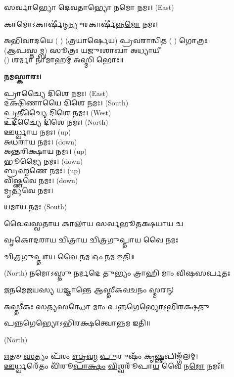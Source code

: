 𑌸𑌰𑍍𑌵𑌾𑌭𑍍𑌯𑍋 𑌦𑍇𑌵𑌤𑌾𑌭𑍍𑌯𑍋 𑌨𑌮𑍋 𑌨𑌮𑌃। {\scriptsize (East)}

𑌕𑌾𑌮𑍋𑌽𑌕𑌾𑌰𑍍\mbox{}𑌷𑍀॑𑌨𑍍𑌮𑌨𑍍𑌯𑍁𑌰𑌕𑌾𑌰𑍍\mbox{}𑌷𑍀॑𑌨𑍍𑌨\-\ul{𑌮𑍋} 𑌨𑌮𑌃।

𑌅𑌭𑌿𑌵𑌾𑌦𑌯𑍇 ( ) (𑌤𑍍𑌰𑌯𑌾𑌰𑍍𑌷𑍇𑌯) 𑌪𑍍𑌰𑌵𑌰𑌾𑌨𑍍𑌵𑌿𑌤 ( ) 𑌗𑍋𑌤𑍍𑌰𑌃\\
(𑌆𑌪𑌸𑍍𑌤𑌮𑍍𑌬) 𑌸𑍂𑌤𑍍𑌰𑌃 𑌯𑌜𑍁𑌃𑌶𑌾𑌖𑌾 𑌅𑌧𑍍𑌯𑌾𑌯𑍀\\
() 𑌶𑌰𑍍𑌮𑌾 𑌨𑌾𑌮𑌾𑌹𑌮𑍍 𑌅𑌸𑍍𑌮𑌿 𑌭𑍋𑌃॥

\textbf{𑌨𑌮𑌸𑍍𑌕𑌾𑌰𑌃।}


𑌪𑍍𑌰𑌾𑌚𑍍𑌯𑍈 𑌦𑌿𑌶𑍇 𑌨𑌮𑌃।   {\scriptsize (East)}\\
𑌦𑌕𑍍𑌷𑌿𑌣𑌾𑌯𑍈 𑌦𑌿𑌶𑍇 𑌨𑌮𑌃।  {\scriptsize (South)}\\
𑌪𑍍𑌰𑌤𑍀𑌚𑍍𑌯𑍈 𑌦𑌿𑌶𑍇 𑌨𑌮𑌃।   {\scriptsize (West)}\\
𑌉𑌦𑍀𑌚𑍍𑌯𑍈 𑌦𑌿𑌶𑍇 𑌨𑌮𑌃।   {\scriptsize (North)}\\
𑌊𑌰𑍍𑌧𑍍𑌵𑌾𑌯 𑌨𑌮𑌃।   {\scriptsize (up)}\\
𑌅𑌧𑌰𑌾𑌯 𑌨𑌮𑌃।   {\scriptsize (down)}\\
𑌅𑌨𑍍𑌤𑌰𑌿𑌕𑍍𑌷𑌾𑌯 𑌨𑌮𑌃। {\scriptsize (up)}\\
𑌭𑍂𑌮𑍍𑌯𑍈 𑌨𑌮𑌃। {\scriptsize (down)}\\
𑌬𑍍𑌰𑌹𑍍𑌮𑌣𑍇 𑌨𑌮𑌃। {\scriptsize (up)}\\
𑌵𑌿𑌷𑍍𑌣𑌵𑍇 𑌨𑌮𑌃।  {\scriptsize (down)}\\
𑌮𑍃𑌤𑍍𑌯𑌵𑍇 𑌨𑌮𑌃।

𑌯𑌮𑌾𑌯 𑌨𑌮𑌃   {\scriptsize (South)}

{𑌵𑍈𑌵𑌸𑍍𑌵𑌤𑌾𑌯   𑌕𑌾𑌲𑌾𑌯   𑌸𑌰𑍍𑌵𑌭𑍂𑌤𑌕𑍍𑌷𑌯𑌾𑌯   𑌚}

{𑌵𑍃𑌕𑍋𑌦𑌰𑌾𑌯   𑌚𑌿𑌤𑍍𑌰𑌾𑌯   𑌚𑌿𑌤𑍍𑌰𑌗𑍁𑌪𑍍𑌤𑌾𑌯   𑌵𑍈  𑌨𑌮𑌃}

𑌚𑌿𑌤𑍍𑌰𑌗𑍁𑌪𑍍𑌤𑌾𑌯   𑌵𑍈  𑌨𑌮 𑌓𑌂 𑌨𑌮 𑌇𑌤𑌿॥

 {\scriptsize (North)}
{𑌨𑌮𑍋𑌽𑌸𑍍𑌤𑍁 𑌨𑌰𑍍𑌮𑌦𑍇 𑌤𑍁𑌭𑍍𑌯𑌂 𑌤𑍍𑌰𑌾𑌹𑌿 𑌮𑌾𑌂 𑌵𑌿𑌷𑌸𑌰𑍍𑌪𑌤𑌃}

{𑌜𑌨𑌮𑍇𑌜𑌯𑌸𑍍𑌯 𑌯𑌜𑍍𑌞𑌾𑌨𑍍𑌤𑍇 𑌆𑌸𑍍𑌤𑍀𑌕𑌵𑌚𑌨𑌂 𑌸𑍍𑌮𑌰𑌨𑍍}


{𑌅𑌸𑍍𑌤𑍀𑌕𑌃 𑌸𑌤𑍍𑌯𑌸𑌨𑍍𑌧𑍋 𑌮𑌾𑌂 𑌪𑌨𑍍𑌨𑌗𑍇𑌭𑍍𑌯𑍋𑌽𑌭𑌿𑌰𑌕𑍍𑌷𑌤𑍁}

𑌪𑌨𑍍𑌨𑌗𑍇𑌭𑍍𑌯𑍋𑌽𑌭𑌿𑌰𑌕𑍍𑌷𑌤𑍍𑌵𑍋𑌨𑍍𑌨𑌮 𑌇𑌤𑌿॥

 {\scriptsize (North)}

\-\ul{𑌋}\-𑌤𑍞 \ul{𑌸}\-𑌤𑍍𑌯𑌂 𑌪᳴𑌰𑌂 \ul{𑌬𑍍𑌰}\-\-\ul{𑌹𑍍𑌮} \ul{𑌪𑍁}\-𑌰𑍁𑌷𑌂᳴ 𑌕𑍃\-\ul{𑌷𑍍𑌣}\-𑌪𑌿𑌙𑍍𑌗᳴𑌲𑌮𑍍।\\
\-\ul{𑌊}\-𑌰𑍍𑌧𑍍𑌵𑌰𑍇᳴𑌤𑌂 𑌵𑌿᳴𑌰𑍂\-\ul{𑌪𑌾}\-\-\ul{𑌕𑍍𑌷𑌂} \ul{𑌵𑌿}\-𑌶𑍍𑌵𑌰𑍂᳴𑌪𑌾\-\ul{𑌯} 𑌵𑍈 𑌨\-\ul{𑌮𑍋} 𑌨𑌮𑌃᳴॥


